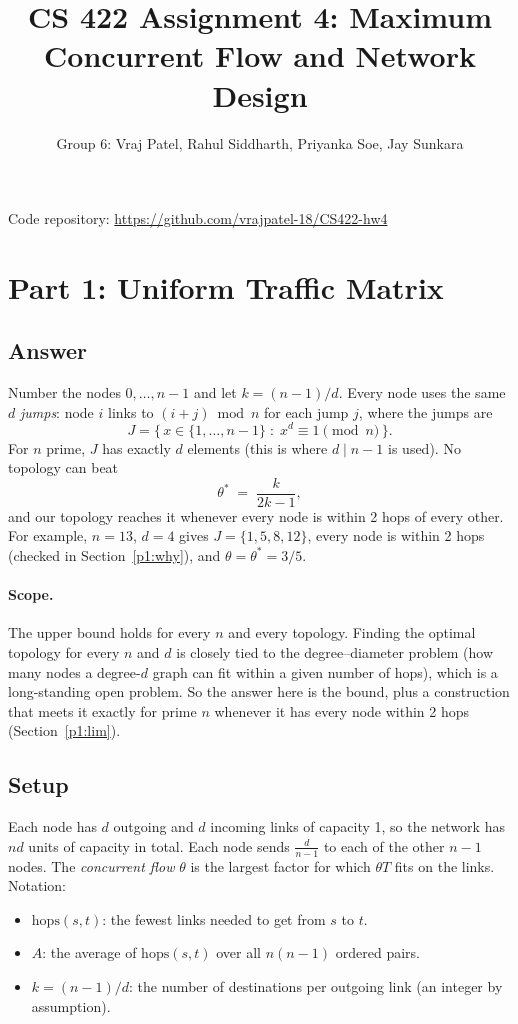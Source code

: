 \documentclass[11pt]{article}
\title{CS 422 Assignment 4: Maximum Concurrent Flow and Network Design}
\author{Group 6: Vraj Patel, Rahul Siddharth, Priyanka Soe, Jay Sunkara}
\date{}
\theoremstyle{definition}
\begin{document}
\maketitle
\vspace{-3em}

\begin{center}
Code repository: \url{https://github.com/vrajpatel-18/CS422-hw4}
\end{center}

\section{Part 1: Uniform Traffic Matrix}\label{p1}

\subsection{Answer}

Number the nodes $0,\dots,n-1$ and let $k = (n-1)/d$. Every node uses the same $d$ \emph{jumps}: node $i$ links to
$(i+j) \bmod n$ for each jump $j$, where the jumps are
\[
J = \{\, x \in \{1,\dots,n-1\} \;:\; x^d \equiv 1 \pmod n \,\}.
\]
For $n$ prime, $J$ has exactly $d$ elements (this is where $d \mid n-1$ is used). No topology can beat
\[
\theta^* \;=\; \frac{k}{2k-1},
\]
and our topology reaches it whenever every node is within 2 hops of every other. For example, $n=13$, $d=4$ gives
$J=\{1,5,8,12\}$, every node is within 2 hops (checked in Section~\ref{p1:why}), and $\theta = \theta^* = 3/5$.

\paragraph{Scope.} The upper bound holds for every $n$ and every topology. Finding the optimal topology for every $n$
and $d$ is closely tied to the degree--diameter problem (how many nodes a degree-$d$ graph can fit within a given
number of hops), which is a long-standing open problem. So the answer here is the bound, plus a construction that
meets it exactly for prime $n$ whenever it has every node within 2 hops (Section~\ref{p1:lim}).

\subsection{Setup}

Each node has $d$ outgoing and $d$ incoming links of capacity 1, so the network has $nd$ units of capacity in total.
Each node sends $\frac{d}{n-1}$ to each of the other $n-1$ nodes. The \emph{concurrent flow} $\theta$ is the largest
factor for which $\theta T$ fits on the links. Notation:
\begin{itemize}
\item $\mathrm{hops}(s,t)$: the fewest links needed to get from $s$ to $t$.
\item $A$: the average of $\mathrm{hops}(s,t)$ over all $n(n-1)$ ordered pairs.
\item $k = (n-1)/d$: the number of destinations per outgoing link (an integer by assumption).
\end{itemize}
\end{document}
